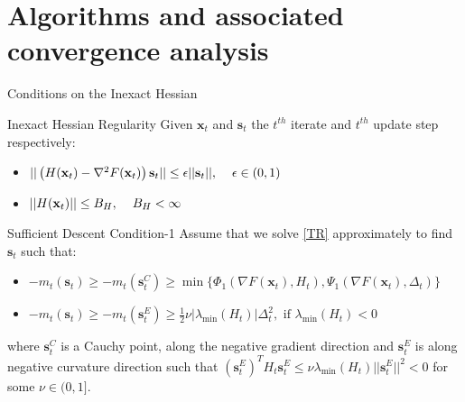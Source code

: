 \documentclass[10pt]{beamer}
\newcommand{\h}{\nabla^{2}}
\newcommand{\g}{\nabla}
\newcommand{\xbold}{\mathbf{x}}
\newcommand{\sbold}{\mathbf{s}}
\newcommand{\mineig}{\lambda_{\min}}
\begin{document}
\section{Algorithms and associated convergence analysis}
\begin{frame}{Conditions on the Inexact Hessian}
\begin{alertblock}{Inexact Hessian Regularity}
Given \(\xbold_{t}\) and \(\sbold_{t}\) the \(t^{th}\) iterate and \(t^{th}\) update step respectively:
\begin{itemize}
\item \(||\left(H(\xbold_{t}) - \h F(\xbold_{t})\right)\sbold_{t}|| \leq \epsilon||\sbold_{t}||, \hspace{4mm} \epsilon \in (0,1)\)
\item \(||H(\xbold_{t}) || \leq B_{H}, \hspace{4mm} B_{H} < \infty\)
\end{itemize}
\end{alertblock}
\pause
\begin{alertblock}{Sufficient Descent Condition-1}
Assume that we solve \ref{TR} approximately to find \(\sbold_{t}\) such that:
\begin{itemize}
\item \(-m_{t}(\sbold_{t}) \geq -m_{t}(\sbold_{t}^{C}) \geq \min\lbrace\Phi_{1}(\g F(\xbold_{t}), H_{t}), \Psi_{1}(\g F(\xbold_{t}), \Delta_{t})\rbrace \)
\item \(-m_{t}(\sbold_{t}) \geq -m_{t}(\sbold_{t}^{E}) \geq \frac{1}{2}\nu|\mineig(H_{t})|\Delta_{t}^{2}, \text{ if } \mineig(H_{t}) < 0 \)
\end{itemize}
where \(\sbold_{t}^{C}\) is a Cauchy point, along the negative gradient direction and \(\sbold_{t}^{E}\) is along negative curvature direction such that \((\sbold_{t}^{E})^{T} H_{t} \sbold_{t}^{E} \leq \nu\mineig(H_{t})||\sbold_{t}^{E}||^{2} < 0\) for some \(\nu \in (0, 1]\).
\end{alertblock}
\end{frame}
\end{document}
